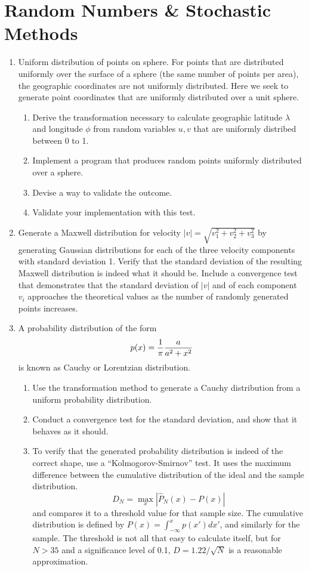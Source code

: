 \documentclass{article}
\begin{document}
\newpage
\section{Random Numbers \& Stochastic Methods}
\begin{enumerate}
\item
Uniform distribution of points on sphere.
For points that are distributed uniformly over the surface of a sphere (the same number of points per area), the geographic coordinates are not uniformly distributed. Here we seek to generate point coordinates that are uniformly distributed over a unit sphere.
\begin{enumerate} \setlength{\itemsep}{0pt}
\item Derive the transformation necessary to calculate geographic latitude $\lambda$ and longitude $\phi$ from random variables $u, v$ that are uniformly distribed between 0 to 1.
\item Implement a program that produces random points uniformly distributed over a sphere.
\item Devise a way to validate the outcome.
\item Validate your implementation with this test.
\end{enumerate}

\item
Generate a Maxwell distribution for velocity $|v|=\sqrt{v_1^2+v_2^2+v_3^2}$ by generating Gaussian distributions for each of the three velocity components with standard deviation 1. Verify that the standard deviation of the resulting Maxwell distribution is indeed what it should be. Include a convergence test that demonstrates that the standard deviation of $|v|$ and of each component $v_i$ approaches the theoretical values as the number of randomly generated points increases.


\item
  A probability distribution of the form
  \[
  p(x) = \frac{1}{\pi} {a \over a^2+x^2}
  \]
  is known as Cauchy or Lorentzian distribution.
  \begin{enumerate} \setlength{\itemsep}{0pt}
  \item Use the transformation method to generate a Cauchy distribution from a uniform probability distribution.
  \item Conduct a convergence test for the standard deviation, and show that it behaves as it should.
  \item To verify that the generated probability distribution is indeed of the correct shape, use a ``Kolmogorov-Smirnov'' test.  It uses the maximum difference between the cumulative distribution of the ideal and the sample distribution.
    \[
    D_N = \max_x |\hat P_N(x) - P(x) |
    \]
    and compares it to a threshold value for that sample size.
    The cumulative distribution is defined by $P(x)=\int_{-\infty}^x p(x') dx'$, and similarly for the sample. The threshold is not all that easy to calculate itself, but for $N>35$ and a significance level of 0.1, $D=1.22/\sqrt{N}$ is a reasonable approximation. 
  \end{enumerate}
  
\end{enumerate}
\end{document}
